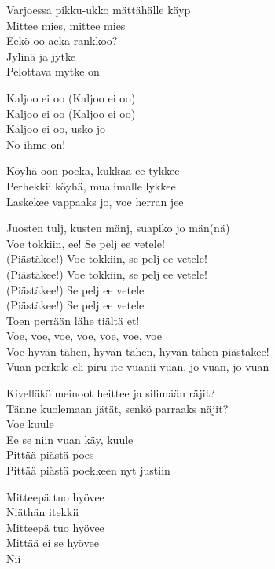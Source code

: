 Varjoessa pikku-ukko mättähälle käyp\\
Mittee mies, mittee mies\\
Eekö oo aeka rankkoo?\\
Jylinä ja jytke\\
Pelottava mytke on

Kaljoo ei oo (Kaljoo ei oo)\\
Kaljoo ei oo (Kaljoo ei oo)\\
Kaljoo ei oo, usko jo\\
No ihme on!

Köyhä oon poeka, kukkaa ee tykkee\\
Perhekkii köyhä, mualimalle lykkee\\
Laskekee vappaaks jo, voe herran jee

Juosten tulj, kusten mänj, suapiko jo män(nä)\\
Voe tokkiin, ee! Se pelj ee vetele!\\
(Piästäkee!) Voe tokkiin, se pelj ee vetele!\\
(Piästäkee!) Voe tokkiin, se pelj ee vetele!\\
(Piästäkee!) Se pelj ee vetele\\
(Piästäkee!) Se pelj ee vetele\\
Toen perrään lähe tiältä et!\\
Voe, voe, voe, voe, voe, voe, voe\\
Voe hyvän tähen, hyvän tähen, hyvän tähen piästäkee!\\
Vuan perkele eli piru ite vuanii vuan, jo vuan, jo vuan

Kivelläkö meinoot heittee ja silimään räjit?\\
Tänne kuolemaan jätät, senkö parraaks näjit?\\
Voe kuule\\
Ee se niin vuan käy, kuule\\
Pittää piästä poes\\
Pittää piästä poekkeen nyt justiin

Mitteepä tuo hyövee\\
Niäthän itekkii\\
Mitteepä tuo hyövee\\
Mittää ei se hyövee\\
Nii